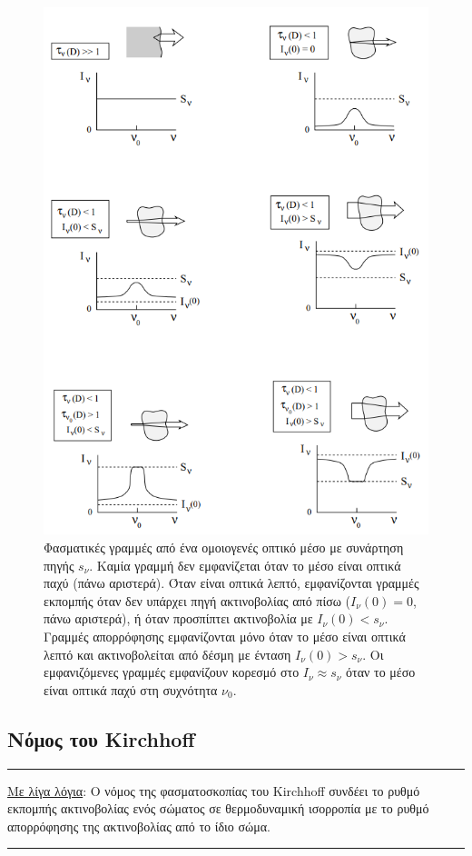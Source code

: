 \begin{figure}
    \centering
    \includegraphics[width=\textwidth]{Figures/optical_depth_examples.png}
    \caption{Φασματικές γραμμές από ένα ομοιογενές οπτικό μέσο με συνάρτηση πηγής $s_{\nu}$. Καμία γραμμή δεν εμφανίζεται όταν το μέσο είναι οπτικά παχύ (πάνω αριστερά). Όταν είναι οπτικά λεπτό, εμφανίζονται γραμμές εκπομπής όταν δεν υπάρχει πηγή ακτινοβολίας από πίσω ($I_{\nu}(0) = 0$, πάνω αριστερά), ή όταν προσπίπτει ακτινοβολία με $I_{\nu}(0) < s_{\nu}$. Γραμμές απορρόφησης εμφανίζονται μόνο όταν το μέσο είναι οπτικά λεπτό και ακτινοβολείται από δέσμη με ένταση $I_{\nu}(0) > s_{\nu}$. Οι εμφανιζόμενες γραμμές εμφανίζουν κορεσμό στο $I_{\nu} \approx s_{\nu}$ όταν το μέσο είναι οπτικά παχύ στη συχνότητα $\nu_0$.}
    \label{fig:optical_depth_examples}
\end{figure}


\subsection{Νόμος του Kirchhoff}
{\color{red} \hrule}
\underline{Με λίγα λόγια}: Ο νόμος της φασματοσκοπίας του Kirchhoff συνδέει το ρυθμό εκπομπής ακτινοβολίας ενός σώματος σε θερμοδυναμική ισορροπία με το ρυθμό απορρόφησης της ακτινοβολίας από το ίδιο σώμα.\\
{\color{red} \hrule}

